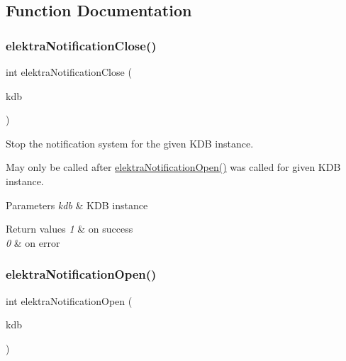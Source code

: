 \subsection{Function Documentation}
\mbox{\label{group__kdbnotification_ga5685dafbd4131011365628d6d9213594}} 
\subsubsection{\texorpdfstring{elektra\+Notification\+Close()}{elektraNotificationClose()}}
{\footnotesize\ttfamily int elektra\+Notification\+Close (\begin{DoxyParamCaption}\item[{K\+DB $\ast$}]{kdb }\end{DoxyParamCaption})}



Stop the notification system for the given K\+DB instance. 

May only be called after \hyperlink{group__kdbnotification_gaeae96154abdb5fdbf1b34a01e2b23e44}{elektra\+Notification\+Open()} was called for given K\+DB instance.


\begin{DoxyParams}{Parameters}
{\em kdb} & K\+DB instance \\
\hline
\end{DoxyParams}

\begin{DoxyRetVals}{Return values}
{\em 1} & on success \\
\hline
{\em 0} & on error \\
\hline
\end{DoxyRetVals}
\mbox{\label{group__kdbnotification_gaeae96154abdb5fdbf1b34a01e2b23e44}} 
\subsubsection{\texorpdfstring{elektra\+Notification\+Open()}{elektraNotificationOpen()}}
{\footnotesize\ttfamily int elektra\+Notification\+Open (\begin{DoxyParamCaption}\item[{K\+DB $\ast$}]{kdb }\end{DoxyParamCaption})}



